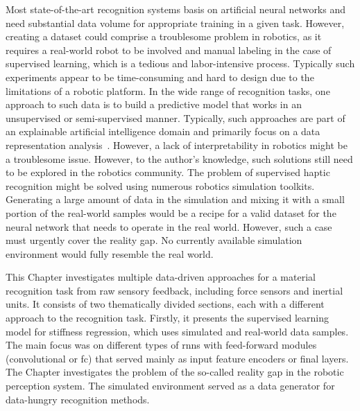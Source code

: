 \documentclass[a4paper, 10pt, twoside]{report}
\begin{document}
Most state-of-the-art recognition systems basis on artificial neural networks and need substantial data volume for appropriate training in a given task. However, creating a dataset could comprise a troublesome problem in robotics, as it requires a real-world robot to be involved and manual labeling in the case of supervised learning, which is a tedious and labor-intensive process. Typically such experiments appear to be time-consuming and hard to design due to the limitations of a robotic platform. In the wide range of recognition tasks, one approach to such data is to build a predictive model that works in an unsupervised or semi-supervised manner. Typically, such approaches are part of an explainable artificial intelligence domain and primarily focus on a data representation analysis~\cite{Ahmadi2021}. However, a lack of interpretability in robotics might be a troublesome issue. However, to the author's knowledge, such solutions still need to be explored in the robotics community. The problem of supervised haptic recognition might be solved using numerous robotics simulation toolkits. Generating a large amount of data in the simulation and mixing it with a small portion of the real-world samples would be a recipe for a valid dataset for the neural network that needs to operate in the real world. However, such a case must urgently cover the reality gap. No currently available simulation environment would fully resemble the real world. 

This Chapter investigates multiple data-driven approaches for a material recognition task from raw sensory feedback, including force sensors and inertial units. It consists of two thematically divided sections, each with a different approach to the recognition task. Firstly, it presents the supervised learning model for stiffness regression, which uses simulated and real-world data samples. The main focus was on different types of \acrshort{rnn}s with feed-forward modules (convolutional or \acrfull{fc}) that served mainly as input feature encoders or final layers. The Chapter investigates the problem of the so-called reality gap in the robotic perception system. The simulated environment served as a data generator for data-hungry recognition methods. 
\end{document}
